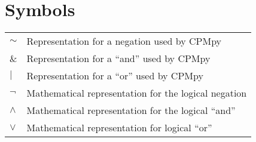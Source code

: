 \documentclass[master=cws, masteroption=se, english, oneside]{kulemt} %
\begin{document}
\section*{Symbols}
\begin{flushleft}
  \renewcommand{\arraystretch}{1.1}
  \begin{tabularx}{\textwidth}{@{}p{14mm}X@{}}
 	$\sim$ & Representation for a negation used by CPMpy\\
 	$\&$ & Representation for a “and” used by CPMpy\\
 	$\vert$ & Representation for a “or” used by CPMpy\\
  	$\neg$ & Mathematical representation for the logical negation \\
  	$\land$ & Mathematical representation for the logical “and” \\
  	$\lor$  & Mathematical representation for logical “or” \\
  \end{tabularx}
\end{flushleft}

\mainmatter



\appendixpage*          %
\appendix


\backmatter
%
%
\nocite{MasterproefRubenKindt}
\printbibliography
\end{document}
